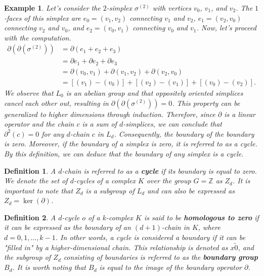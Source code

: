 \documentclass{article}
\newtheorem*{definition}{Definition}
\newtheorem*{example}{Example}
\begin{document}
\begin{example}
Let's consider the $2$-simplex $\sigma^{(2)}$ with vertices $v_0$, $v_1$, and $v_2$. The $1$-faces of this simplex are $e_0 = (v_1,v_2)$ connecting $v_1$ and $v_2$, $e_1 = (v_2,v_0)$ connecting $v_2$ and $v_0$, and $e_2 = (v_0,v_1)$ connecting $v_0$ and $v_1$. Now, let's proceed with the computation.
\begin{align}
\partial(\partial(\sigma^{(2)})) &= \partial (e_1+e_2+e_3) \\
&= \partial e_1 + \partial e_2 + \partial e_3 \\
&= \partial(v_0,v_1) + \partial(v_1,v_2) + \partial(v_2,v_0) \\
&= [(v_1)-(v_0)] + [(v_2)-(v_1)]+[(v_0)-(v_2)].
\end{align}
We observe that $L_0$ is an abelian group and that oppositely oriented simplices cancel each other out, resulting in $\partial(\partial(\sigma^{(2)})) = 0$. This property can be generalized to higher dimensions through induction. Therefore, since $\partial$ is a linear operator and the chain $c$ is a sum of $d$-simplices, we can conclude that $\partial^2(c) = 0$ for any $d$-chain $c$ in $L_d$. Consequently, the boundary of the boundary is zero. Moreover, if the boundary of a simplex is zero, it is referred to as a \emph{cycle}. By this definition, we can deduce that the boundary of any simplex is a cycle.
\end{example}

\begin{definition}
A $d$-chain is referred to as a \textbf{cycle} if its boundary is equal to zero. We denote the set of $d$-cycles of a complex $K$ over the group $G=\mathbb{Z}$ as $Z_d$. It is important to note that $Z_d$ is a subgroup of $L_d$ and can also be expressed as $Z_d = \ker(\partial)$.
\end{definition}

\begin{definition}
A $d$-cycle $o$ of a $k$-complex $K$ is said to be \textbf{homologous to zero} if it can be expressed as the boundary of an $(d+1)$-chain in $K$, where $d=0,1,\ldots,k-1$. In other words, a cycle is considered a boundary if it can be "filled in" by a higher-dimensional chain. This relationship is denoted as $x \tilde 0$, and the subgroup of $Z_d$ consisting of boundaries is referred to as the \textbf{boundary group $B_d$}. It is worth noting that $B_d$ is equal to the image of the boundary operator $\partial$.
\end{definition}
\end{document}
